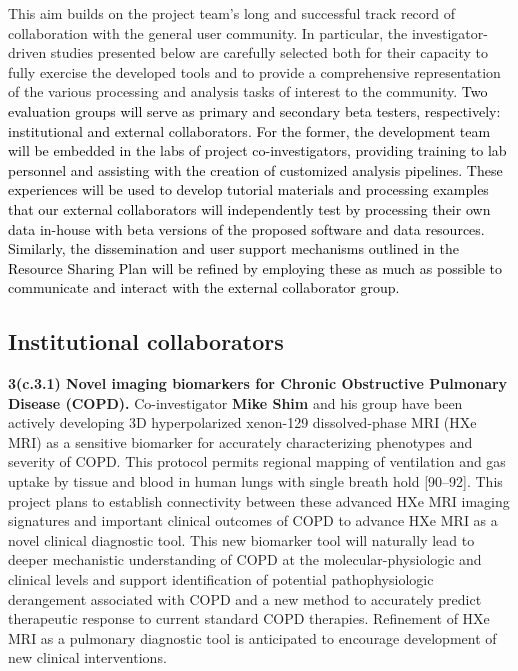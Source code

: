 \documentclass[11pt,]{article}
\begin{document}
This aim builds on the project team's long and successful track record
of collaboration with the general user community. In particular, the
investigator-driven studies presented below are carefully selected both
for their capacity to fully exercise the developed tools and to provide
a comprehensive representation of the various processing and analysis
tasks of interest to the community.
\textcolor{black}{Two evaluation groups will serve as primary and secondary beta testers, respectively:
institutional and external collaborators.  For the former, the development team will be embedded in
the labs of project co-investigators, providing training to lab personnel and assisting with the
creation of customized analysis pipelines.  These experiences will be used to develop tutorial
materials and processing examples that our external collaborators will independently test by
processing their own data in-house with beta versions of the proposed software and data resources.
Similarly, the dissemination and user support mechanisms outlined in the Resource Sharing Plan will
be refined by employing these as much as possible to communicate and interact with the external
collaborator group.}

\subsection{Institutional
collaborators}\label{institutional-collaborators}

\textbf{3(c.3.1) Novel imaging biomarkers for Chronic Obstructive
Pulmonary Disease (COPD).} Co-investigator \textbf{Mike Shim} and his
group have been actively developing 3D hyperpolarized xenon-129
dissolved-phase MRI (HXe MRI) as a sensitive biomarker for accurately
characterizing phenotypes and severity of COPD. This protocol permits
regional mapping of ventilation and gas uptake by tissue and blood in
human lungs with single breath hold {[}90--92{]}. This project plans to
establish connectivity between these advanced HXe MRI imaging signatures
and important clinical outcomes of COPD to advance HXe MRI as a novel
clinical diagnostic tool. This new biomarker tool will naturally lead to
deeper mechanistic understanding of COPD at the molecular-physiologic
and clinical levels and support identification of potential
pathophysiologic derangement associated with COPD and a new method to
accurately predict therapeutic response to current standard COPD
therapies. Refinement of HXe MRI as a pulmonary diagnostic tool is
anticipated to encourage development of new clinical interventions.
\end{document}
